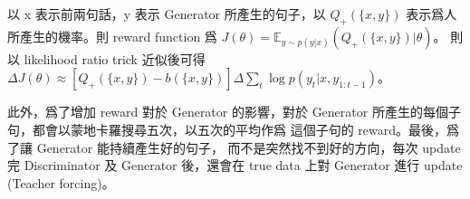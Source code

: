 \documentclass[12pt, a4paper]{article}
\theoremstyle{mystyle}	%
\begin{document}
\begin{enumerate}
\begin{enumerate}
    以 x 表示前兩句話，y 表示 Generator 所產生的句子，以
    $Q_+(\{x,y\})$ 表示爲人所產生的機率。則 reward function
    爲 $J(\theta) = \mathbb{E}_{y \sim p(y|x)}(Q_+(\{x, y\})|\theta) $。
    則以 likelihood ratio trick 近似後可得
    $\Delta J(\theta) \approx [Q_+(\{x,y\})-b(\{x,y\})] \Delta 
    \sum\limits_t \log p(y_t|x,y_{1:t-1})$。

    此外，爲了增加 reward 對於 Generator 的影響，對於 Generator
    所產生的每個子句，都會以蒙地卡羅搜尋五次，以五次的平均作爲
    這個子句的 reward。最後，爲了讓 Generator 能持續產生好的句子，
    而不是突然找不到好的方向，每次 update 完 Discriminator 及
    Generator 後，還會在 true data 上對 Generator 進行 update
    (Teacher forcing)。
\end{enumerate}
\end{enumerate}
\end{document}
